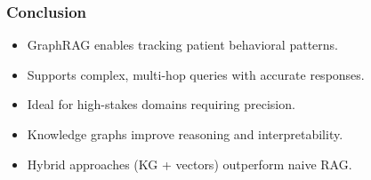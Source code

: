\begin{frame}[fragile]\frametitle{Conclusion}
    \begin{itemize}
        \item GraphRAG enables tracking patient behavioral patterns.
        \item Supports complex, multi-hop queries with accurate responses.
        \item Ideal for high-stakes domains requiring precision.
        \item Knowledge graphs improve reasoning and interpretability.
        \item Hybrid approaches (KG + vectors) outperform naive RAG.
    \end{itemize}
\end{frame}





